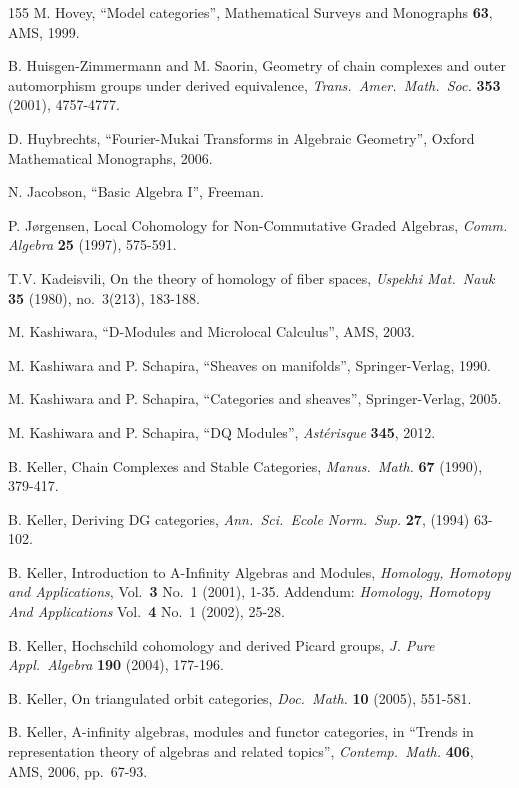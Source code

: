 \begin{thebibliography}{155}
 M. Hovey, 
``Model categories'', 
Mathematical Surveys and Monographs {\bf 63}, AMS, 1999.

 B. Huisgen-Zimmermann and M. Saorin,
Geometry of chain complexes and outer automorphism groups under derived 
equivalence, 
{\em Trans.\ Amer.\ Math.\ Soc.} {\bf 353} (2001), 4757-4777.

 D. Huybrechts, 
``Fourier-Mukai Transforms in Algebraic Geometry'',
Oxford Mathematical Monographs, 2006.

 N. Jacobson, ``Basic Algebra I'', Freeman.

 P. J{\o}rgensen, Local Cohomology for Non-Commutative Graded 
Algebras,
{\em Comm. Algebra} {\bf 25} (1997), 575-591. 

 T.V. Kadeisvili, 
On the theory of homology of fiber spaces, 
{\em Uspekhi Mat.\ Nauk} {\bf 35} (1980), no.\ 3(213), 183-188.


 M. Kashiwara, 
``D-Modules and Microlocal Calculus'', 
AMS, 2003. 

 M. Kashiwara and P. Schapira, 
``Sheaves on manifolds'', Springer-Verlag, 1990.

 M. Kashiwara and P. Schapira, 
``Categories and sheaves'', Springer-Verlag, 2005.

 M. Kashiwara and P. Schapira, 
``DQ Modules'', {\em Ast\'erisque} {\bf 345}, 2012. 

 B. Keller, 
Chain Complexes and Stable Categories,
{\em Manus.\ Math.} {\bf 67} (1990), 379-417.

 B. Keller, 
Deriving DG categories, 
{\em Ann.\ Sci.\ Ecole Norm.\ Sup.} {\bf 27}, (1994) 63-102.

 B. Keller, 
Introduction to A-Infinity Algebras and Modules,
{\em Homology, Homotopy and Applications}, Vol.\ {\bf 3} No.\ 1 (2001), 1-35.  
Addendum: 
{\em Homology, Homotopy And Applications} Vol.\ {\bf 4} No.\ 1 (2002), 25-28.

 B. Keller,
Hochschild cohomology and derived Picard groups,
{\em J. Pure Appl.\ Algebra} {\bf 190} (2004), 177-196.

 B. Keller,
On triangulated orbit categories, 
{\em Doc.\ Math.} {\bf 10} (2005), 551-581.

 B. Keller,
A-infinity algebras, modules and functor categories,
in ``Trends in representation theory of algebras and related topics'',
{\em Contemp.\ Math.} {\bf 406}, AMS, 2006, pp.\ 67-93.


\end{thebibliography}
